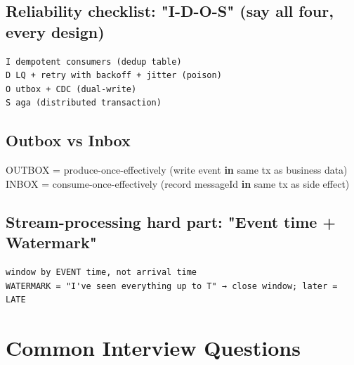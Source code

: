 \documentclass[11pt]{article}
\newenvironment{Shaded}{\begin{snugshade}}{\end{snugshade}}
\newcommand{\ImportTok}[1]{\textcolor[rgb]{0.15,0.68,0.38}{#1}}
\newcommand{\KeywordTok}[1]{\textcolor[rgb]{0.81,0.81,0.76}{\textbf{#1}}}
\newcommand{\NormalTok}[1]{\textcolor[rgb]{0.81,0.81,0.76}{#1}}
\newcommand{\OperatorTok}[1]{\textcolor[rgb]{0.81,0.81,0.76}{#1}}
\begin{document}
\subsection{Reliability checklist: "I-D-O-S" (say all four, every design)}\label{reliability-checklist-i-d-o-s-say-all-four-every-design}

\setcodelang{}

\begin{verbatim}
I dempotent consumers (dedup table)
D LQ + retry with backoff + jitter (poison)
O utbox + CDC (dual-write)
S aga (distributed transaction)
\end{verbatim}

\subsection{Outbox vs Inbox}\label{outbox-vs-inbox}


\begin{Shaded}
\begin{Highlighting}[]
\NormalTok{OUTBOX }\OperatorTok{=}\NormalTok{ produce}\OperatorTok{{-}}\NormalTok{once}\OperatorTok{{-}}\NormalTok{effectively  (write event }\KeywordTok{in}\NormalTok{ same tx }\ImportTok{as}\NormalTok{ business data)}
\NormalTok{INBOX  }\OperatorTok{=}\NormalTok{ consume}\OperatorTok{{-}}\NormalTok{once}\OperatorTok{{-}}\NormalTok{effectively  (record messageId }\KeywordTok{in}\NormalTok{ same tx }\ImportTok{as}\NormalTok{ side effect)}
\end{Highlighting}
\end{Shaded}

\subsection{Stream-processing hard part: "Event time + Watermark"}\label{stream-processing-hard-part-event-time--watermark}

\setcodelang{}

\begin{verbatim}
window by EVENT time, not arrival time
WATERMARK = "I've seen everything up to T" → close window; later = LATE
\end{verbatim}

\section{Common Interview Questions}\label{common-interview-questions}
\end{document}

